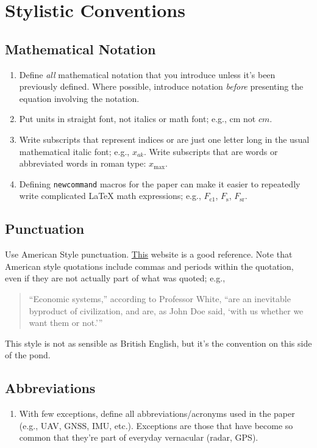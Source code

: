 \documentclass[10pt,journal,twocolumn]{IEEEtran} %
\newcommand{\Fc}[1]{\ensuremath{F_{\text{c}#1}}}
\newcommand{\Fs}{\ensuremath{F_\text{s}}}
\newcommand{\Fsr}{\ensuremath{F_\text{sr}}}
\begin{document}
\section{Stylistic Conventions}
\subsection{Mathematical Notation}
\begin{enumerate}
\item Define \emph{all} mathematical notation that you introduce unless it's
  been previously defined.  Where possible, introduce notation \emph{before}
  presenting the equation involving the notation.
\item Put units in straight font, not italics or math font; e.g., cm not $cm$.
\item Write subscripts that represent indices or are just one letter long in
  the usual mathematical italic font; e.g., ${x}_{ak}$.  Write subscripts that
  are words or abbreviated words in roman type: ${x}_{\text{max}}$.
\item Defining {\tt newcommand} macros for the paper can make it easier to
  repeatedly write complicated LaTeX math expressions; e.g., $\Fc{1}$, $\Fs$,
  $\Fsr$.
\end{enumerate}

\subsection{Punctuation}
Use American Style punctuation.
\href{https://www.thepunctuationguide.com/british-versus-american-style.html}{This}
website is a good reference. Note that American style quotations include
commas and periods within the quotation, even if they are not actually part of
what was quoted; e.g.,
\begin{quotation}
  “Economic systems,” according to Professor White, “are an inevitable
  byproduct of civilization, and are, as John Doe said, ‘with us whether we
  want them or not.’”
\end{quotation}
This style is not as sensible as British English, but it's the convention on
this side of the pond.  

\subsection{Abbreviations}
\begin{enumerate}
\item With few exceptions, define all abbreviations/acronyms used in
  the paper (e.g., UAV, GNSS, IMU, etc.).  Exceptions are those that have
  become so common that they're part of everyday vernacular (radar, GPS). 
\end{enumerate}
\end{document}
